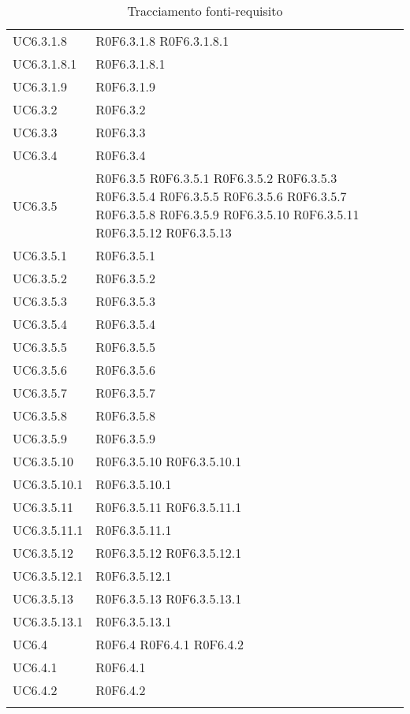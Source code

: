 \begin{longtable}{p{2.5cm}!{\VRule[1pt]}p{2.5cm}}
UC6.3.1.8 & R0F6.3.1.8
	\newline R0F6.3.1.8.1\\
UC6.3.1.8.1 & R0F6.3.1.8.1\\
UC6.3.1.9 & R0F6.3.1.9\\
UC6.3.2 & R0F6.3.2\\
UC6.3.3 & R0F6.3.3\\
UC6.3.4 & R0F6.3.4\\
UC6.3.5 & R0F6.3.5
	\newline R0F6.3.5.1
	\newline R0F6.3.5.2
	\newline R0F6.3.5.3
	\newline R0F6.3.5.4
	\newline R0F6.3.5.5
	\newline R0F6.3.5.6
	\newline R0F6.3.5.7
	\newline R0F6.3.5.8
	\newline R0F6.3.5.9
	\newline R0F6.3.5.10
	\newline R0F6.3.5.11
	\newline R0F6.3.5.12
	\newline R0F6.3.5.13\\
UC6.3.5.1 & R0F6.3.5.1\\
UC6.3.5.2 & R0F6.3.5.2\\
UC6.3.5.3 & R0F6.3.5.3\\
UC6.3.5.4 & R0F6.3.5.4\\
UC6.3.5.5 & R0F6.3.5.5\\
UC6.3.5.6 & R0F6.3.5.6\\
UC6.3.5.7 & R0F6.3.5.7\\
UC6.3.5.8 & R0F6.3.5.8\\
UC6.3.5.9 & R0F6.3.5.9\\
UC6.3.5.10 & R0F6.3.5.10
	\newline R0F6.3.5.10.1\\
UC6.3.5.10.1 & R0F6.3.5.10.1\\
UC6.3.5.11 & R0F6.3.5.11
	\newline R0F6.3.5.11.1\\
UC6.3.5.11.1 & R0F6.3.5.11.1\\
UC6.3.5.12 & R0F6.3.5.12
	\newline R0F6.3.5.12.1\\
UC6.3.5.12.1 & R0F6.3.5.12.1\\
UC6.3.5.13 & R0F6.3.5.13
	\newline R0F6.3.5.13.1\\
UC6.3.5.13.1 & R0F6.3.5.13.1\\
UC6.4 & R0F6.4
	\newline R0F6.4.1
	\newline R0F6.4.2\\
UC6.4.1 & R0F6.4.1\\
UC6.4.2 & R0F6.4.2\\

\caption{Tracciamento fonti-requisito}
\end{longtable}